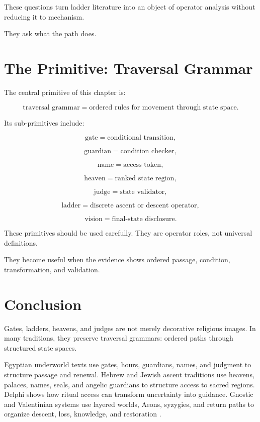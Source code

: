 \documentclass[11pt]{book}
\begin{document}
These questions turn ladder literature into an object of operator analysis without reducing it to mechanism.

They ask what the path does.

\section{The Primitive: Traversal Grammar}

The central primitive of this chapter is:

\[
\text{traversal grammar} = \text{ordered rules for movement through state space}.
\]

Its sub-primitives include:

\[
\text{gate} = \text{conditional transition},
\]

\[
\text{guardian} = \text{condition checker},
\]

\[
\text{name} = \text{access token},
\]

\[
\text{heaven} = \text{ranked state region},
\]

\[
\text{judge} = \text{state validator},
\]

\[
\text{ladder} = \text{discrete ascent or descent operator},
\]

\[
\text{vision} = \text{final-state disclosure}.
\]

These primitives should be used carefully. They are operator roles, not universal definitions.

They become useful when the evidence shows ordered passage, condition, transformation, and validation.

\section{Conclusion}

Gates, ladders, heavens, and judges are not merely decorative religious images. In many traditions, they preserve traversal grammars: ordered paths through structured state spaces.

Egyptian underworld texts use gates, hours, guardians, names, and judgment to structure passage and renewal. Hebrew and Jewish ascent traditions use heavens, palaces, names, seals, and angelic guardians to structure access to sacred regions. Delphi shows how ritual access can transform uncertainty into guidance. Gnostic and Valentinian systems use layered worlds, Aeons, syzygies, and return paths to organize descent, loss, knowledge, and restoration \cite{Hornung1999BooksAfterlife,Hornung1990BookGates,Scholem1974Kabbalah,Idel1988KabbalahNewPerspectives,Fontenrose1978DelphicOracle,Jonas1963GnosticReligion}.
\end{document}
